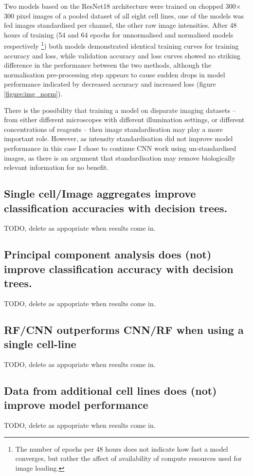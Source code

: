 \documentclass[a4paper,11pt,twoside,openright]{scrbook}
\begin{document}
Two models based on the ResNet18 architecture were trained on chopped 300$\times$300 pixel images of a pooled dataset of all eight cell lines, one of the models was fed images standardised per channel, the other raw image intensities.
After 48 hours of training (54 and 64 epochs for unnormalised and normalised models respectively \footnote{The number of epochs per 48 hours does not indicate how fast a model converges, but rather the affect of availability of compute resources used for image loading.}) both models demonstrated identical training curves for training accuracy and loss, while validation accuracy and loss curves showed no striking difference in the performance between the two methods, although the normalisation pre-processing step appears to cause sudden drops in model performance indicated by decreased accuracy and increased loss (figure \ref{figure:img_norm}).

There is the possibility that training a model on disparate imaging datasets -- from either different microscopes with different illumination settings, or different concentrations of reagents -- then image standardisation may play a more important role.
However, as intensity standardisation did not improve model performance in this case I chose to continue CNN work using un-standardised images, as there is an argument that standardisation may remove biologically relevant information for no benefit.


\subsection{Single cell/Image aggregates improve classification accuracies with decision trees.}
TODO, delete as appopriate when results come in.

\subsection{Principal component analysis does (not) improve classification accuracy with decision trees.}
TODO, delete as appopriate when results come in.

\subsection{RF/CNN outperforms CNN/RF when using a single cell-line}
TODO, delete as appopriate when results come in.


\subsection{Data from additional cell lines does (not) improve model performance}
TODO, delete as appopriate when results come in.
\end{document}
